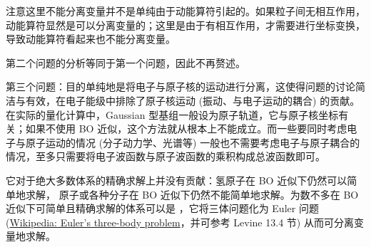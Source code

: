 注意这里不能分离变量并不是单纯由于动能算符引起的。如果粒子间无相互作用，动能算符显然是可以分离变量的；这里是由于有相互作用，才需要进行坐标变换，导致动能算符看起来也不能分离变量。


第二个问题的分析等同于第一个问题，因此不再赘述。

第三个问题：目的单纯地是将电子与原子核的运动进行分离，这使得问题的讨论简洁与有效，在电子能级中排除了原子核运动 (振动、与电子运动的耦合) 的贡献。在实际的量化计算中，Gaussian 型基组一般设为原子轨道，它与原子核坐标有关；如果不使用 BO 近似，这个方法就从根本上不能成立。而一些要同时考虑电子与原子运动的情况 (分子动力学、光谱等) 一般也不需要考虑电子与原子耦合的情况，至多只需要将电子波函数与原子波函数的乘积构成总波函数即可。

它对于绝大多数体系的精确求解上并没有贡献：氢原子在 BO 近似下仍然可以简单地求解， 原子或各种分子在 BO 近似下仍然不能简单地求解。为数不多在 BO 近似下可简单且精确求解的体系可以是 ，它将三体问题化为 Euler 问题 (\href{https://en.wikipedia.org/wiki/Euler\%27s_three-body_problem}{Wikipedia: Euler's three-body problem}，并可参考 Levine 13.4 节) 从而可分离变量地求解。

